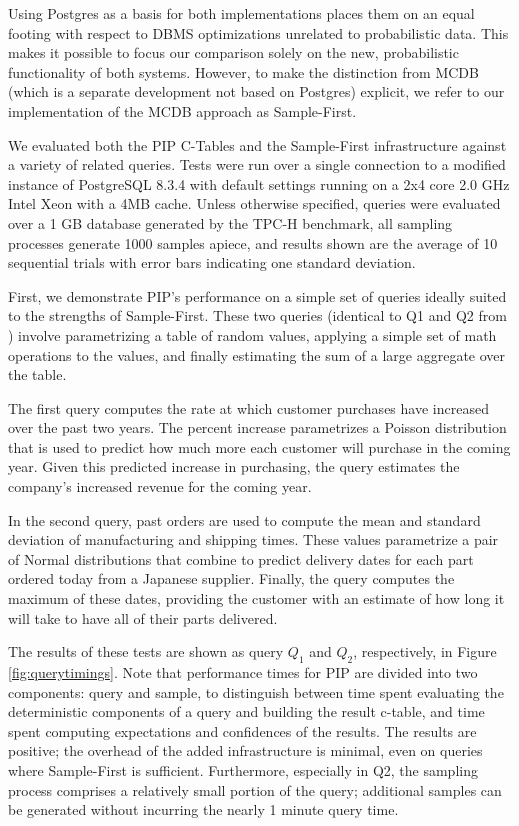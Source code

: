 Using Postgres as a basis for both implementations places them on an equal footing with respect to DBMS optimizations unrelated to probabilistic data.  This makes it possible to focus our comparison solely on the new, probabilistic functionality of both systems.  However, to make the distinction from MCDB (which is a separate development not based on Postgres) explicit, we refer to our implementation of the MCDB approach as Sample-First.

We evaluated both the PIP C-Tables and the Sample-First infrastructure against a variety of related queries.  Tests were run over a single connection to a modified instance of PostgreSQL 8.3.4 with default settings running on a 2x4 core 2.0 GHz Intel Xeon with a 4MB cache.  Unless otherwise specified, queries were evaluated over a 1 GB database generated by the TPC-H benchmark, all sampling processes generate 1000 samples apiece, and results shown are the average of 10 sequential trials with error bars indicating one standard deviation.

First, we demonstrate PIP's performance on a simple set of queries ideally suited to the strengths of Sample-First.  These two queries (identical to Q1 and Q2 from \cite{MCDB}) involve pa\-ra\-me\-tri\-zing a table of random values, applying a simple set of math operations to the values, and finally estimating the sum of a large aggregate over the table.  

The first query computes the rate at which customer purchases have increased over the past two years.  The percent increase parametrizes a Poisson distribution that is used to predict how much more each customer will purchase in the coming year.  Given this predicted increase in purchasing, the query estimates the company's increased revenue for the coming year.

In the second query, past orders are used to compute the mean and standard deviation of manufacturing and shipping times.  These values parametrize a pair of Normal distributions that combine to predict delivery dates for each part ordered today from a Japanese supplier.  Finally, the query computes the maximum of these dates, providing the customer with an estimate of how long it will take to have all of their parts delivered.

The results of these tests are shown as query $Q_1$ and $Q_2$, respectively, in Figure \ref{fig:querytimings}.  Note that performance times for PIP are divided into two components: query and sample, to distinguish between time spent evaluating the deterministic components of a query and building the result c-table, and time spent computing expectations and confidences of the results.  The results are positive; the overhead of the added infrastructure is minimal, even on queries where Sample-First is sufficient.  Furthermore, especially in Q2, the sampling process comprises a relatively small portion of the query; additional samples can be generated without incurring the nearly 1 minute query time.

